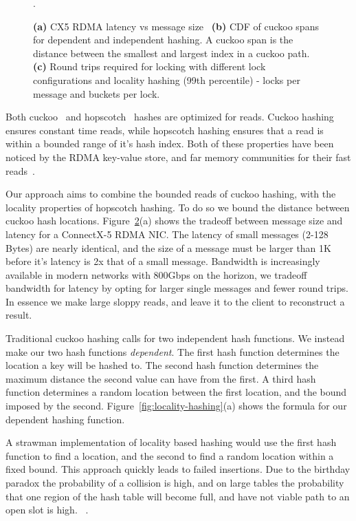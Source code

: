 \begin{figure}[t]
\begin{subfigure}{0.3\linewidth}
        \label{fig:tbd}
    \end{subfigure}.
    \vspace{-1em}
    \caption{
    \textbf{(a)} CX5 RDMA latency vs message size~\cite{rdma-latency}
    \textbf{(b)} CDF of cuckoo spans for dependent and independent hashing. A cuckoo span is the distance between the smallest and largest index in a cuckoo path.
    \textbf{(c)} Round trips required for locking with different lock configurations and locality hashing (99th percentile) - locks per message and buckets per lock.
    }
    \label{fig:rdma}

\end{figure}


Both cuckoo~\cite{cuckoo} and hopscotch~\cite{hopscotch}
hashes are optimized for reads. Cuckoo hashing ensures
constant time reads, while hopscotch hashing ensures that a
read is within a bounded range of it's hash index. Both of
these properties have been noticed by the RDMA key-value
store, and far memory communities for their fast
reads~\cite{memc3,cuckoo-improvements,pilaf,farm}.

Our approach aims to combine the bounded reads of cuckoo
hashing, with the locality properties of hopscotch hashing.
To do so we bound the distance between cuckoo hash
locations. Figure~\ref{fig:rdma}(a) shows the tradeoff
between message size and latency for a ConnectX-5 RDMA NIC.
The latency of small messages (2-128 Bytes) are nearly
identical, and the size of a message must be larger than 1K
before it's latency is 2x that of a small message. Bandwidth
is increasingly available in modern networks with 800Gbps on
the horizon, we tradeoff bandwidth for latency by opting for
larger single messages and fewer round trips. In essence we
make large sloppy reads, and leave it to the client to
reconstruct a result.

Traditional cuckoo hashing calls for two independent hash
functions. We instead make our two hash functions
\textit{dependent}. The first hash function determines the
location a key will be hashed to. The second hash function
determines the maximum distance the second value can have
from the first. A third hash function determines a random
location between the first location, and the bound imposed
by the second. Figure~\ref{fig:locality-hashing}(a) shows
the formula for our dependent hashing function.

A strawman implementation of locality based hashing would
use the first hash function to find a location, and the
second to find a random location within a fixed bound. This
approach quickly leads to failed insertions. Due to the
birthday paradox the probability of a collision is high, and
on large tables the probability that one region of the hash
table will become full, and have not viable path to an open
slot is high. ~.

